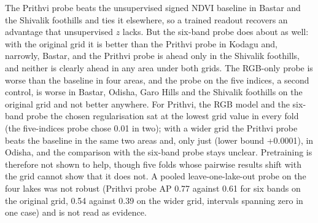 \documentclass[11pt]{article}
\begin{document}
The Prithvi probe beats the unsupervised signed NDVI baseline in Bastar and the Shivalik foothills and ties it elsewhere, so a trained readout recovers an advantage that unsupervised $z$ lacks. But the six-band probe does about as well: with the original grid it is better than the Prithvi probe in Kodagu and, narrowly, Bastar, and the Prithvi probe is ahead only in the Shivalik foothills, and neither is clearly ahead in any area under both grids. The RGB-only probe is worse than the baseline in four areas, and the probe on the five indices, a second control, is worse in Bastar, Odisha, Garo Hills and the Shivalik foothills on the original grid and not better anywhere. For Prithvi, the RGB model and the six-band probe the chosen regularisation sat at the lowest grid value in every fold (the five-indices probe chose 0.01 in two); with a wider grid the Prithvi probe beats the baseline in the same two areas and, only just (lower bound +0.0001), in Odisha, and the comparison with the six-band probe stays unclear. Pretraining is therefore not shown to help, though five folds whose pairwise results shift with the grid cannot show that it does not. A pooled leave-one-lake-out probe on the four lakes was not robust (Prithvi probe AP 0.77 against 0.61 for six bands on the original grid, 0.54 against 0.39 on the wider grid, intervals spanning zero in one case) and is not read as evidence.

\begin{table}[t]\centering\small
\caption{Linear probe on forest loss, average precision of the held-out area (difference with 95\% block-bootstrap interval; * excludes zero). The last column repeats the paired comparison with the wider regularisation grid.}\label{tab:probe}
\end{table}
\end{document}
